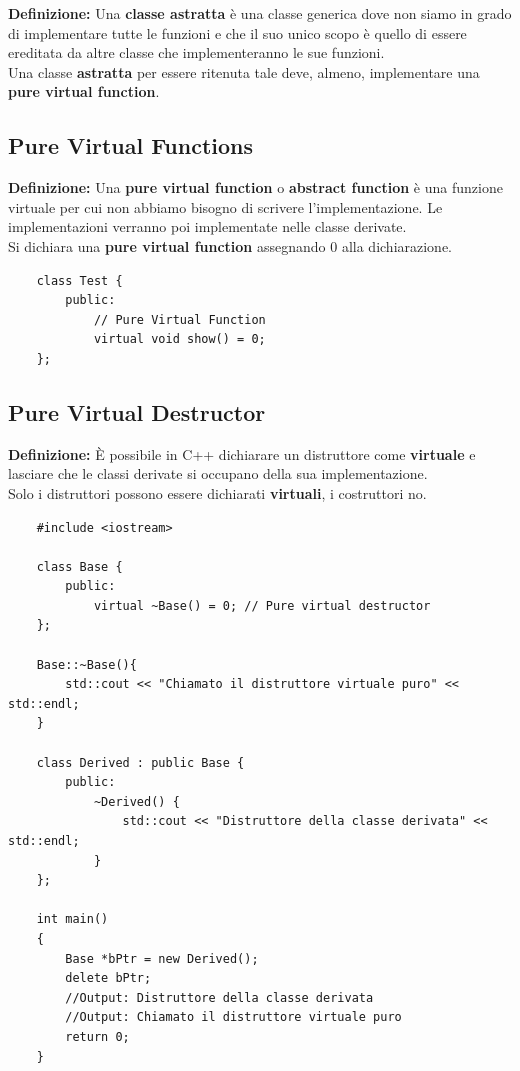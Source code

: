 \textsf{\small \textbf{Definizione: } Una \textbf{classe astratta} è una classe generica dove non siamo in grado di implementare tutte le funzioni e che il suo unico scopo è quello di essere ereditata da altre classe che implementeranno le sue funzioni.} \\

\textsf{\small Una classe \textbf{astratta} per essere ritenuta tale deve, almeno, implementare una \textbf{pure virtual function}.} \\

\subsection{Pure Virtual Functions}

\textsf{\small \textbf{Definizione: } Una \textbf{pure virtual function} o \textbf{abstract function} è una funzione virtuale per cui non abbiamo bisogno di scrivere l'implementazione. Le implementazioni verranno poi implementate nelle classe derivate.} \\

\textsf{\small Si dichiara una \textbf{pure virtual function} assegnando 0 alla dichiarazione.} \\

\begin{lstlisting}
	class Test {
		public:
			// Pure Virtual Function
			virtual void show() = 0;
	};
\end{lstlisting}

\subsection{Pure Virtual Destructor} %

\textsf{\small \textbf{Definizione: } È possibile in C++ dichiarare un distruttore come \textbf{virtuale} e lasciare che le classi derivate si occupano della sua implementazione.} \\

\textsf{\small Solo i distruttori possono essere dichiarati \textbf{virtuali}, i costruttori no.} \\

\begin{lstlisting}
	#include <iostream>
	
	class Base {
		public:
			virtual ~Base() = 0; // Pure virtual destructor
	};

	Base::~Base(){
		std::cout << "Chiamato il distruttore virtuale puro" << std::endl;
	}

	class Derived : public Base {
		public:
			~Derived() {
				std::cout << "Distruttore della classe derivata" << std::endl;
			}
	};

	int main()
	{
		Base *bPtr = new Derived();
		delete bPtr;
		//Output: Distruttore della classe derivata
		//Output: Chiamato il distruttore virtuale puro
		return 0;
	}
\end{lstlisting}


